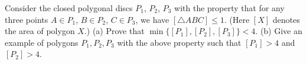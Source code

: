 Consider the closed polygonal discs $P_1$, $P_2$, $P_3$ with the property that for any three points $A\in P_1$, $B\in P_2$, $C\in P_3$, we have $[\triangle ABC]\le 1$. (Here $[X]$ denotes the area of polygon $X$.)
(a) Prove that $\min\{[P_1],[P_2],[P_3]\}<4$.
(b) Give an example of polygons $P_1,P_2,P_3$ with the above property such that $[P_1]>4$ and $[P_2]>4$.